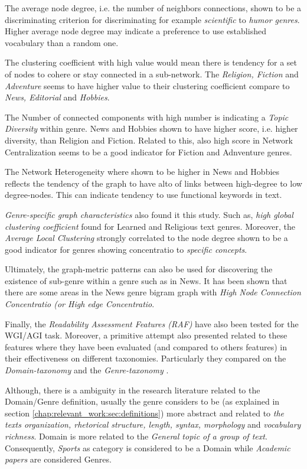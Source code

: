 The average node degree, i.e. the number of neighbors connections, shown  to be a discriminating criterion for discriminating for example \textit{scientific} to \textit{humor genres}. Higher average node degree may indicate a preference to use established vocabulary than a random one.

The clustering coefficient with high value would mean there is tendency for a set of nodes to cohere or stay connected in a sub-network. The \textit{Religion, Fiction} and \textit{Adventure} seems to have higher value to their clustering coefficient compare to \textit{News, Editorial} and \textit{Hobbies}. 

The Number of connected components with high number is indicating a \textit{Topic Diversity} within genre. News and Hobbies shown to have higher score, i.e. higher diversity, than Religion and Fiction. Related to this, also high score in Network Centralization seems to be a good indicator for Fiction and Adnventure genres.

The Network Heterogeneity where shown to be higher in News and Hobbies reflects the tendency of the graph to have alto of links between high-degree to low degree-nodes. This can indicate tendency to use functional keywords in text.

\textit{Genre-specific graph characteristics} also found it this study. Such as, \textit{high global clustering coefficient} found for Learned and Religious text genres. Moreover, the \textit{Average Local Clustering} strongly correlated to the node degree shown to be a good indicator for genres showing concentratio to \textit{specific concepts}.

Ultimately, the graph-metric patterns can also be used for discovering the existence of sub-genre within a genre such as in News. It has been shown that there are some areas in the News genre bigram graph with \textit{High Node Connection Concentratio (or High edge Concentratio}.  

 Finally, the \textit{Readability Assessment Features (RAF)} have also been tested for the WGI/AGI task. Moreover, a primitive attempt also presented related to these features where they have been evaluated (and compared to others features) in their effectiveness on different taxonomies. Particularly they compared on the \textit{Domain-taxonomy} and the \textit{Genre-taxonomy} \parencite{falkenjack2016exploratory}.

Although, there is a ambiguity in the research literature related to the Domain/Genre definition, usually the genre considers to be (as explained in section \ref{chap:relevant_work:sec:definitions}) more abstract and related to \textit{the texts organization, rhetorical structure, length, syntax, morphology} and \textit{vocabulary richness}. Domain is more related to the \textit{General topic of a group of text}. Consequently, \textit{Sports} as category is considered to be a Domain while \textit{Academic papers} are considered Genres.

